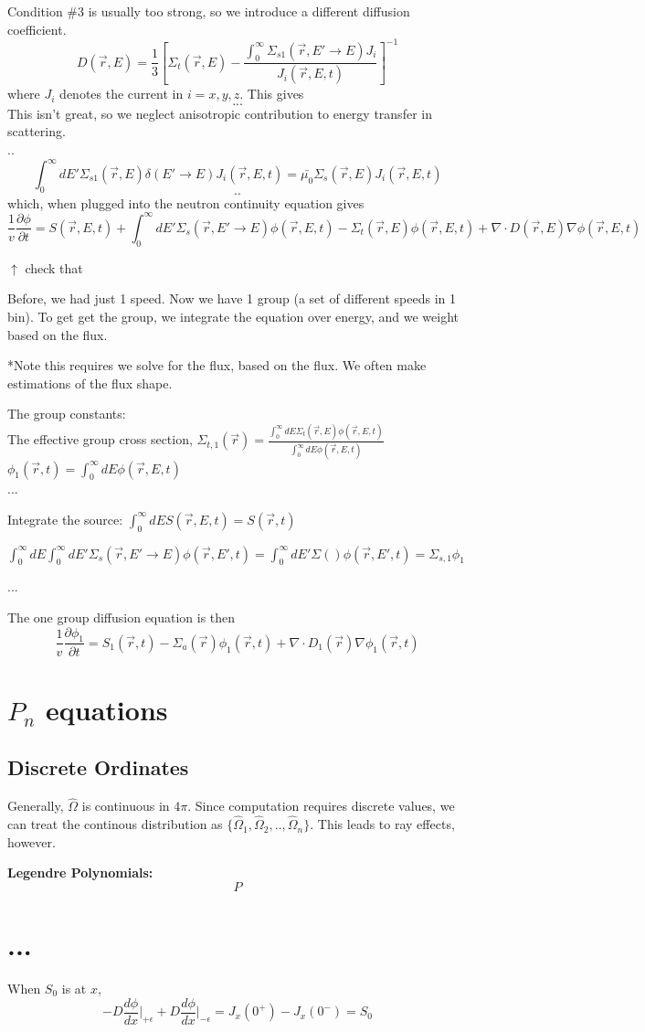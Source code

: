 \documentclass{report}
\newcommand{\h}[1]{\section*{#1}}
\newcommand{\hh}[1]{\subsection*{#1}}
\newcommand{\p}{\partial}
\newcommand{\Xs}{\Sigma}
\newcommand{\Oov}{\frac{1}{v}}
\newcommand{\pos}{\vec{r}}
\newcommand{\Oh}{\hat{\Omega}}
\newcommand{\intzi}{\int_0^{\infty}}
\newcommand{\rt}{(\pos,t)}
\newcommand{\rE}{(\pos,E)}
\newcommand{\rEt}{(\pos,E,t)}
\newcommand{\rEtprime}{(\pos,E',t)}
\begin{document}
Condition \#3 is usually too strong, so we introduce a different diffusion coefficient.
$$ D\rE = \frac{1}{3}\left[\Xs_t\rE - \frac{\intzi \Xs_{s1}(\pos,E' \rightarrow E) J_i}{J_i\rEt }\right]^{-1}$$
where $J_i$ denotes the current in $i = x,y,z$. This gives
$$...$$
This isn't great, so we neglect anisotropic contribution to energy transfer in scattering.\\
..\\
$$\intzi dE' \Xs_{s1}\rE \delta(E' \rightarrow E) J_i\rEt = \bar{\mu_0}\Xs_s\rE J_i\rEt$$
$$..$$
which, when plugged into the neutron continuity equation gives 
$$\Oov \frac{\p \phi}{\p t} = S\rEt + \intzi dE' \Xs_s(\pos,E' \rightarrow E) \phi\rEt - \Xs_t\rE \phi\rEt + \nabla \cdot D\rE \nabla \phi\rEt$$ 

$\uparrow$ check that

Before, we had just 1 speed. Now we have 1 group (a set of different speeds in 1 bin). To get get the group, we integrate the equation over energy, and we weight based on the flux. 

*Note this requires we solve for the flux, based on the flux. We often make estimations of the flux shape.

The group constants:\\
The effective group cross section, $\Xs_{t,1}(\pos) = \frac{\intzi dE \Xs_t\rE \phi\rEt}{\intzi dE \phi\rEt}$
$\phi_1\rt = \intzi dE \phi\rEt$\\
...

Integrate the source:
$\intzi dE S\rEt = S\rt$

$\intzi dE \intzi dE' \Xs_s(\pos,E' \rightarrow E)\phi\rEtprime = \intzi dE' \Xs()\phi\rEtprime = \Xs_{s,1}\phi_1$

$...$

The one group diffusion equation is then
$$ \Oov \frac{\p \phi_1}{\p t} = S_1\rt - \Xs_a(\pos)\phi_1\rt + \nabla \cdot D_1(\pos) \nabla \phi_1\rt $$



\h{$P_n$ equations}

\hh{Discrete Ordinates}

Generally, $\Oh$ is continuous in $4\pi$. Since computation requires discrete values, we can treat the continous distribution as $\{\Oh_1, \Oh_2, .. , \Oh_n\}$. This leads to ray effects, however.

\textbf{Legendre Polynomials: } 
$$ P $$

\h{...}

When $S_0$ is at $x$,
$$-D\frac{d\phi}{dx}\bigg|_{+\epsilon} + D\frac{d\phi}{dx}\bigg|_{-\epsilon} = J_x(0^+) - J_x(0^-) = S_0$$
\end{document}

